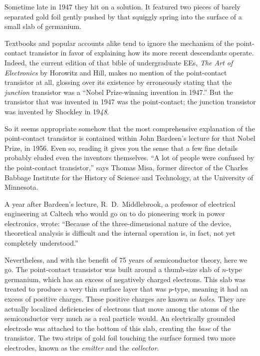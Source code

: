 \documentclass[12pt]{article}
\begin{document}
Sometime late in 1947 they hit on a solution. It featured two pieces of barely separated gold foil gently pushed by that squiggly spring into the surface of a small slab of germanium.

Textbooks and popular accounts alike tend to ignore the mechanism of the point-contact transistor in favor of explaining how its more recent descendants operate. Indeed, the current edition of that bible of undergraduate EEs, {\it The Art of Electronics} by Horowitz and Hill, makes no mention of the point-contact transistor at all, glossing over its existence by erroneously stating that the {\it junction} transistor was a ``Nobel Prize-winning invention in 1947.'' But the transistor that was invented in 1947 was the point-contact; the junction transistor was invented by Shockley in 19{\it 48}.

So it seems appropriate somehow that the most comprehensive explanation of the point-contact transistor is contained within John Bardeen’s lecture for that Nobel Prize, in 1956. Even so, reading it gives you the sense that a few fine details probably eluded even the inventors themselves. ``A lot of people were confused by the point-contact transistor,'' says Thomas Misa, former director of the Charles Babbage Institute for the History of Science and Technology, at the University of Minnesota.

A year after Bardeen’s lecture, R.~D.~Middlebrook, a professor of electrical engineering at Caltech who would go on to do pioneering work in power electronics, wrote: ``Because of the three-dimensional nature of the device, theoretical analysis is difficult and the internal operation is, in fact, not yet completely understood.''

Nevertheless, and with the benefit of 75 years of semiconductor theory, here we go. The point-contact transistor was built around a thumb-size slab of $n$-type germanium, which has an excess of negatively charged electrons. This slab was treated to produce a very thin surface layer that was $p$-type, meaning it had an excess of positive charges. These positive charges are known as {\it holes}. They are actually localized deficiencies of electrons that move among the atoms of the semiconductor very much as a real particle would. An electrically grounded electrode was attached to the bottom of this slab, creating the {\it base} of the transistor. The two strips of gold foil touching the surface formed two more electrodes, known as the {\it emitter} and the {\it collector}.
\end{document}
